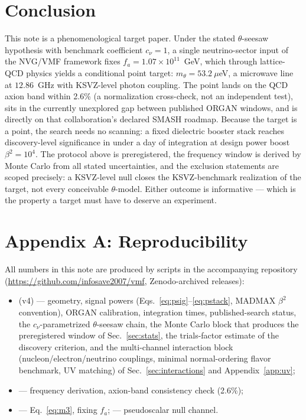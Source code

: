 \documentclass[11pt,a4paper]{article}
\begin{document}
\section{Conclusion}
\label{sec:concl}

This note is a phenomenological target paper. Under the stated
$\theta$-seesaw hypothesis with benchmark coefficient $c_\nu = 1$, a single
neutrino-sector input of the NVG/VMF framework fixes
$f_a = 1.07\times 10^{11}$~GeV, which through lattice-QCD physics yields a
conditional point target: $m_\theta = 53.2~\mu$eV, a microwave line at
$12.86$~GHz with KSVZ-level photon coupling. The point lands on the QCD axion
band within 2.6\% (a normalization cross-check, not an independent test),
sits in the currently unexplored gap between published ORGAN windows, and is
directly on that collaboration's declared SMASH roadmap. Because the target is
a point, the search needs no scanning: a fixed dielectric booster stack
reaches discovery-level significance in under a day of integration at design
power boost $\beta^2 = 10^4$. The protocol above is preregistered, the
frequency window is derived by Monte Carlo from all stated uncertainties, and
the exclusion statements are scoped precisely: a KSVZ-level null closes the
KSVZ-benchmark realization of the target, not every conceivable
$\theta$-model. Either outcome is informative --- which is the property a
target must have to deserve an experiment.

\section*{Appendix A: Reproducibility}
\label{app:repro}

All numbers in this note are produced by scripts in the accompanying
repository (\url{https://github.com/infosave2007/vmf},
Zenodo-archived releases):
\begin{sloppypar}
\begin{itemize}
\item {} (v4) ---
geometry, signal powers (Eqs.~\eqref{eq:psig}--\eqref{eq:pstack}, MADMAX
$\beta^2$ convention), ORGAN calibration, integration times,
published-search status, the $c_\nu$-parametrized $\theta$-seesaw chain, the
Monte Carlo block that produces the preregistered window of
Sec.~\ref{sec:stats}, the trials-factor estimate of the discovery criterion,
and the multi-channel interaction block (nucleon/electron/neutrino
couplings, minimal normal-ordering flavor benchmark, UV matching) of
Sec.~\ref{sec:interactions} and Appendix~\ref{app:uv};
\item {} ---
frequency derivation, axion-band consistency check (2.6\%);
\item {} --- Eq.~\eqref{eq:m3},
fixing $f_a$;  ---
pseudoscalar null channel.
\end{itemize}
\end{sloppypar}
\end{document}
